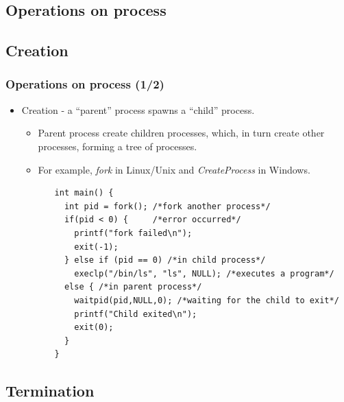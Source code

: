 \documentclass[CJKutf8,xcolor=pdftex,dvipsnames,table]{beamer}
\begin{document}
\begin{CJK*}{UTF8}{song}
  \section{Operations on process}

  \subsection{Creation}
  
  \begin{frame}[fragile]
  \frametitle{Operations on process (1/2)} \pause
  \begin{itemize}
  \item{Creation \pause - a ``parent'' process spawns a ``child'' process.} \pause
    \begin{itemize}
    \item{Parent process create children processes, which, in turn create other processes, forming a tree of processes.} \pause
    \item{For example, \emph{fork} in Linux/Unix and \emph{CreateProcess} in Windows.} \pause
    \end{itemize}
  \end{itemize}
\begin{lstlisting}
          int main() {
            int pid = fork(); /*fork another process*/
            if(pid < 0) {     /*error occurred*/
              printf("fork failed\n");
              exit(-1);
            } else if (pid == 0) /*in child process*/
              execlp("/bin/ls", "ls", NULL); /*executes a program*/
            else { /*in parent process*/
              waitpid(pid,NULL,0); /*waiting for the child to exit*/
              printf("Child exited\n");
              exit(0);
            }
          }
\end{lstlisting}
\end{frame}

  \subsection{Termination}


\end{CJK*}
\end{document}
